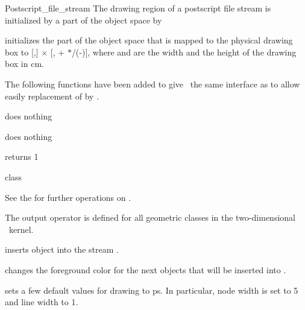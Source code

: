 \begin{ccClass} {Postscript_file_stream}
\ccOperations
The drawing region of a postscript file stream is initialized by a part of the 
object space by

{initializes the  part of the object space that is mapped to the physical
drawing box to [,] $\times$ [, + 
$*$/(-)], where  and  
are the width and the height of the drawing box in cm.}

The following functions have been added to give \ccClassName\ the same interface
as  to allow easily replacement of  by
\ccClassName. 

{does nothing}

{does nothing}

{returns 1}

{class }

See the 
\cite{mnsu-lum} for further operations on .

\def\ccTagRmEigenClassName{\ccFalse}


The output operator is defined for all geometric classes in the two-dimensional
\cgal\ kernel.

       {inserts object  into the stream \ccVar.}

       {changes the foreground color for the next objects that
        will be inserted into \ccVar.}

{sets a few default values for drawing to ps. In particular, node width is
set to 5 and line width to 1.}


\end{ccClass}
